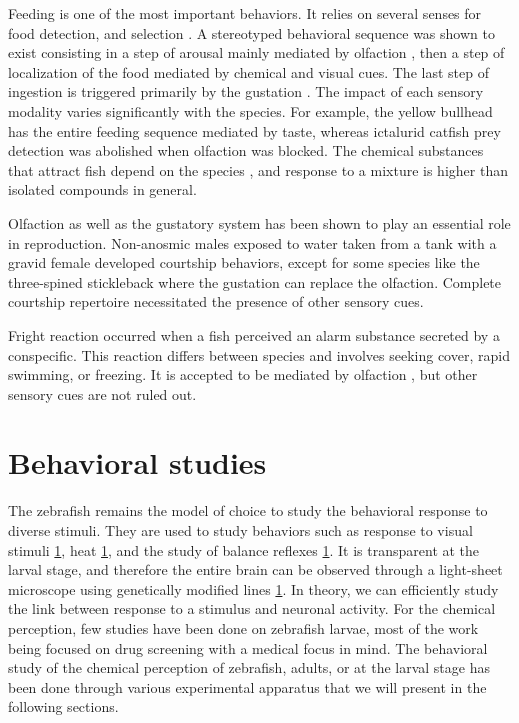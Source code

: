     Feeding is one of the most important behaviors. It relies on several senses for food detection, and selection \cite{pavlov1990sensory}. A stereotyped behavioral sequence was shown to exist \cite{atema1980chemical} consisting in a step of arousal mainly mediated by olfaction \cite{bateson1890sense}, then a step of localization of the food mediated by chemical and visual cues. The last step of ingestion is triggered primarily by the gustation \cite{atema1980chemical}. The impact of each sensory modality varies significantly with the species. For example, the yellow bullhead has the entire feeding sequence mediated by taste, whereas ictalurid catfish prey detection was abolished when olfaction was blocked. The chemical substances that attract fish depend on the species \cite{atema 1982}, and response to a mixture is higher than isolated compounds in general.

    Olfaction \cite{tavolga1956visual} as well as the gustatory system \cite{de1983influence} has been shown to play an essential role in reproduction. Non-anosmic males exposed to water taken from a tank with a gravid female developed courtship behaviors, except for some species like the three-spined stickleback where the gustation can replace the olfaction. Complete courtship repertoire necessitated the presence of other sensory cues.

  Fright reaction occurred when a fish perceived an alarm substance secreted by a conspecific. This reaction differs between species and involves seeking cover, rapid swimming, or freezing. It is accepted to be mediated by olfaction \cite{frisch1942schreckstoff,speedie2008alarm,doving2009alarm}, but other sensory cues are not ruled out.

  \section{Behavioral studies}
  The zebrafish remains the model of choice to study the behavioral response to diverse stimuli.  They are used to study behaviors such as response to visual stimuli \ref{}, heat \ref{}, and the study of balance reflexes \ref{}. It is transparent at the larval stage, and therefore the entire brain can be observed through a light-sheet microscope using genetically modified lines \ref{}. In theory, we can efficiently study the link between response to a stimulus and neuronal activity.
  For the chemical perception, few studies have been done on zebrafish larvae, most of the work being focused on drug screening with a medical focus in mind. The behavioral study of the chemical perception of zebrafish, adults, or at the larval stage has been done through various experimental apparatus that we will present in the following sections.


